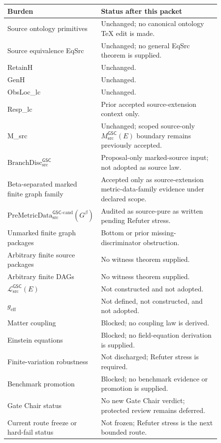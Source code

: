 \documentclass[11pt]{article}
\newcommand{\PreMetricData}{\mathrm{PreMetricData}_{\mathrm{src}}^{\mathsf{GSC}\mbox{-}\mathrm{cand}}}
\newcommand{\MetricData}{\mathcal{L}_{\mathrm{src}}^{\mathsf{GSC}}}
\newcommand{\BranchDisc}{\mathrm{BranchDisc}_{\mathrm{src}}^{\mathsf{GSC}}}
\newcommand{\Gbeta}{G^\beta}
\newcommand{\geff}{g_{\mathrm{eff}}}
\begin{document}
\begin{longtable}{p{0.30\linewidth}p{0.56\linewidth}}
\toprule
Burden & Status after this packet \\
\midrule
Source ontology primitives & Unchanged; no canonical ontology TeX edit is made. \\
Source equivalence EqSrc & Unchanged; no general EqSrc theorem is supplied. \\
RetainH & Unchanged. \\
GenH & Unchanged. \\
ObsLoc\_lc & Unchanged. \\
Resp\_lc & Prior accepted source-extension context only. \\
M\_src & Unchanged; scoped source-only \(M_{\mathrm{src}}^{\mathsf{GSC}}(E)\) boundary remains previously accepted. \\
\(\BranchDisc\) & Proposal-only marked-source input; not adopted as source law. \\
Beta-separated marked finite graph family & Accepted only as source-extension metric-data-family evidence under declared scope. \\
\(\PreMetricData(\Gbeta)\) & Audited as source-pure as written pending Refuter stress. \\
Unmarked finite graph packages & Bottom or prior missing-discriminator obstruction. \\
Arbitrary finite source packages & No witness theorem supplied. \\
Arbitrary finite DAGs & No witness theorem supplied. \\
\(\MetricData(E)\) & Not constructed and not adopted. \\
\(\geff\) & Not defined, not constructed, and not adopted. \\
Matter coupling & Blocked; no coupling law is derived. \\
Einstein equations & Blocked; no field-equation derivation is supplied. \\
Finite-variation robustness & Not discharged; Refuter stress is required. \\
Benchmark promotion & Blocked; no benchmark evidence or promotion is supplied. \\
Gate Chair status & No new Gate Chair verdict; protected review remains deferred. \\
Current route freeze or hard-fail status & Not frozen; Refuter stress is the next bounded route. \\
\bottomrule
\end{longtable}
\end{document}
